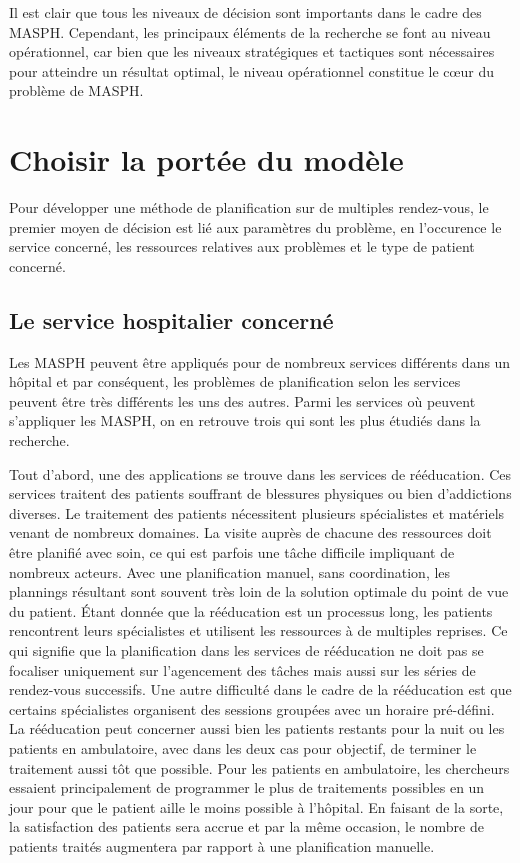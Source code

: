 \documentclass[noposter]{polytech/polytech}
\begin{document}
Il est clair que tous les niveaux de décision sont importants dans le cadre des MASPH. Cependant, les principaux éléments de la recherche se font au niveau opérationnel, car bien que les niveaux stratégiques et tactiques sont nécessaires pour atteindre un résultat optimal, le niveau opérationnel constitue le cœur du problème de MASPH. 


\section{Choisir la portée du modèle}

Pour développer une méthode de planification sur de multiples rendez-vous, le premier moyen de décision est lié aux paramètres du problème, en l'occurence le service concerné, les ressources relatives aux problèmes et le type de patient concerné. 


\subsection{Le service hospitalier concerné}

Les MASPH peuvent être appliqués pour de nombreux services différents dans un hôpital et par conséquent, les problèmes de planification selon les services peuvent être très différents les uns des autres. Parmi les services où peuvent s'appliquer les MASPH, on en retrouve trois qui sont les plus étudiés dans la recherche. 

Tout d'abord, une des applications se trouve dans les services de rééducation. Ces services traitent des patients souffrant de blessures physiques ou bien d'addictions diverses. Le traitement des patients nécessitent plusieurs spécialistes et matériels venant de nombreux domaines. La visite auprès de chacune des ressources doit être planifié avec soin, ce qui est parfois une tâche difficile impliquant de nombreux acteurs. Avec une planification manuel, sans coordination, les plannings résultant sont souvent très loin de la solution optimale du point de vue du patient. Étant donnée que la rééducation est un processus long, les patients rencontrent leurs spécialistes et utilisent les ressources à de multiples reprises. Ce qui signifie que la planification dans les services de rééducation ne doit pas se focaliser uniquement sur l'agencement des tâches mais aussi sur les séries de rendez-vous successifs. Une autre difficulté dans le cadre de la rééducation est que certains spécialistes organisent des sessions groupées avec un horaire pré-défini. La rééducation peut concerner aussi bien les patients restants pour la nuit ou les patients en ambulatoire, avec dans les deux cas pour objectif, de terminer le traitement aussi tôt que possible. Pour les patients en ambulatoire, les chercheurs essaient principalement de programmer le plus de traitements possibles en un jour pour que le patient aille le moins possible à l'hôpital. En faisant de la sorte, la satisfaction des patients sera accrue et par la même occasion, le nombre de patients traités augmentera par rapport à une planification manuelle. 
\end{document}
